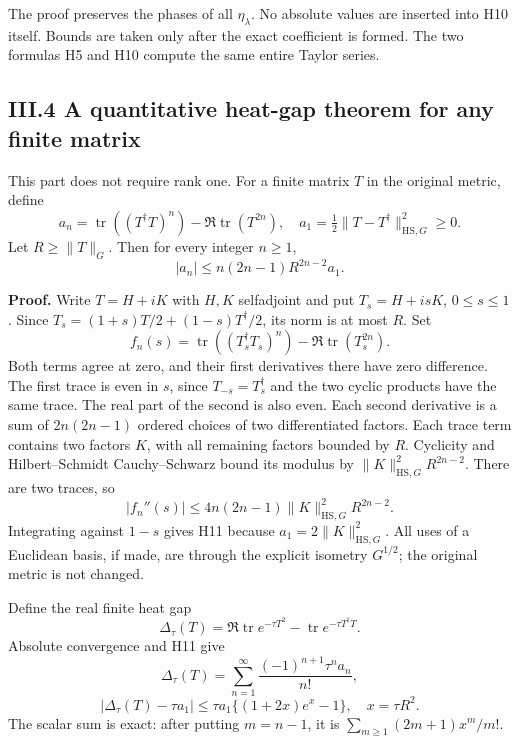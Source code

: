 The proof preserves the phases of all \(\eta_\lambda\). No absolute
values are inserted into H10 itself. Bounds are taken only after the
exact coefficient is formed. The two formulas H5 and H10 compute the
same entire Taylor series.

\subsection{III.4 A quantitative heat-gap theorem for any finite
matrix}\label{iii.4-a-quantitative-heat-gap-theorem-for-any-finite-matrix}

This part does not require rank one. For a finite matrix \(T\) in the
original metric, define \[
a_n=\operatorname{tr}((T^\dagger T)^n)-\Re\operatorname{tr}(T^{2n}),
\quad a_1=\tfrac12\|T-T^\dagger\|_{\mathrm{HS},G}^2\ge0.
\] Let \(R\ge\|T\|_G\). Then for every integer \(n\ge1\), \[
\boxed{|a_n|\le n(2n-1)R^{2n-2}a_1.}
\tag{H11}
\]

\textbf{Proof.} Write \(T=H+iK\) with \(H,K\) selfadjoint and put
\(T_s=H+isK\), \(0\le s\le1\). Since \(T_s=(1+s)T/2+(1-s)T^\dagger/2\),
its norm is at most \(R\). Set \[
f_n(s)=\operatorname{tr}((T_s^\dagger T_s)^n)
-\Re\operatorname{tr}(T_s^{2n}).
\] Both terms agree at zero, and their first derivatives there have zero
difference. The first trace is even in \(s\), since
\(T_{-s}=T_s^\dagger\) and the two cyclic products have the same trace.
The real part of the second is also even. Each second derivative is a
sum of \(2n(2n-1)\) ordered choices of two differentiated factors. Each
trace term contains two factors \(K\), with all remaining factors
bounded by \(R\). Cyclicity and Hilbert--Schmidt Cauchy--Schwarz bound
its modulus by \(\|K\|_{\mathrm{HS},G}^2R^{2n-2}\). There are two
traces, so \[
|f_n''(s)|\le4n(2n-1)\|K\|_{\mathrm{HS},G}^2R^{2n-2}.
\] Integrating against \(1-s\) gives H11 because
\(a_1=2\|K\|_{\mathrm{HS},G}^2\). All uses of a Euclidean basis, if
made, are through the explicit isometry \(G^{1/2}\); the original metric
is not changed.

Define the real finite heat gap \[
\Delta_\tau(T)=\Re\operatorname{tr}e^{-\tau T^2}
-\operatorname{tr}e^{-\tau T^\dagger T}.
\] Absolute convergence and H11 give \[
\Delta_\tau(T)=\sum_{n=1}^\infty
\frac{(-1)^{n+1}\tau^na_n}{n!},
\] \[
\boxed{
|\Delta_\tau(T)-\tau a_1|
\le\tau a_1\{(1+2x)e^x-1\},\quad x=\tau R^2.
}
\tag{H12}
\] The scalar sum is exact: after putting \(m=n-1\), it is
\(\sum_{m\ge1}(2m+1)x^m/m!\).

